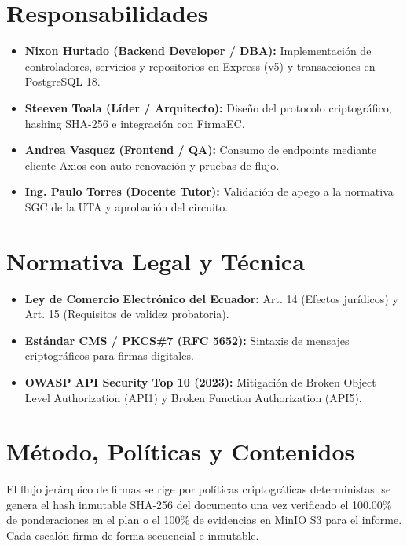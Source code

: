 \documentclass[12pt,a4paper]{article}
\begin{document}
\section{Responsabilidades}
\begin{itemize}[leftmargin=1.5em, itemsep=2pt, topsep=2pt]
    \item \textbf{Nixon Hurtado (Backend Developer / DBA):} Implementación de controladores, servicios y repositorios en Express (v5) y transacciones en PostgreSQL 18.
    \item \textbf{Steeven Toala (Líder / Arquitecto):} Diseño del protocolo criptográfico, hashing SHA-256 e integración con FirmaEC.
    \item \textbf{Andrea Vasquez (Frontend / QA):} Consumo de endpoints mediante cliente Axios con auto-renovación y pruebas de flujo.
    \item \textbf{Ing. Paulo Torres (Docente Tutor):} Validación de apego a la normativa SGC de la UTA y aprobación del circuito.
\end{itemize}

\section{Normativa Legal y Técnica}
\begin{itemize}[leftmargin=1.5em, itemsep=2pt]
    \item \textbf{Ley de Comercio Electrónico del Ecuador:} Art. 14 (Efectos jurídicos) y Art. 15 (Requisitos de validez probatoria).
    \item \textbf{Estándar CMS / PKCS\#7 (RFC 5652):} Sintaxis de mensajes criptográficos para firmas digitales.
    \item \textbf{OWASP API Security Top 10 (2023):} Mitigación de Broken Object Level Authorization (API1) y Broken Function Authorization (API5).
\end{itemize}

\section{Método, Políticas y Contenidos}
El flujo jerárquico de firmas se rige por políticas criptográficas deterministas: se genera el hash inmutable SHA-256 del documento una vez verificado el 100.00\% de ponderaciones en el plan o el 100\% de evidencias en MinIO S3 para el informe. Cada escalón firma de forma secuencial e inmutable.
\end{document}

